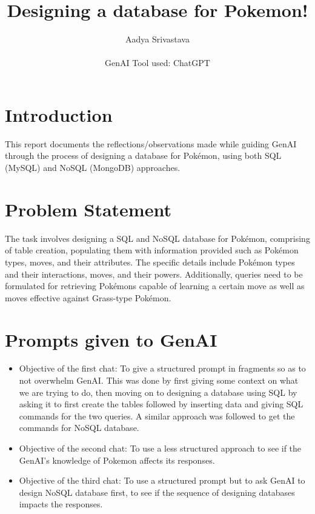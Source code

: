 \documentclass[10pt,onecolumn,letterpaper]{article}
\title{
    \usefont{OT1}{bch}{b}{n}
    \huge Designing a database for Pokemon!
}
\author{\large Aadya Srivastava \\ \\ GenAI Tool used: ChatGPT}
\begin{document}
\maketitle
{}

\section{Introduction}
This report documents the reflections/observations made while guiding GenAI through the process of designing a database for Pokémon, using both SQL (MySQL) and NoSQL (MongoDB) approaches.

\section{Problem Statement} 
The task involves designing a SQL and NoSQL database for Pokémon, comprising of table creation, populating them with information provided such as Pokémon types, moves, and their attributes. The specific details include Pokémon types and their interactions, moves, and their powers. Additionally, queries need to be formulated for retrieving Pokémons capable of learning a certain move as well as moves effective against Grass-type Pokémon.

\section{Prompts given to GenAI}
\begin{itemize}
    \item Objective of the first chat: To give a structured prompt in fragments so as to not overwhelm GenAI. This was done by first giving some context on what we are trying to do, then moving on to designing a database using SQL by asking it to first create the tables followed by inserting data and giving SQL commands for the two queries. A similar approach was followed to get the commands for NoSQL database.  
    \item Objective of the second chat: To use a less structured approach to see if the GenAI's knowledge of Pokemon affects its responses.
    \item Objective of the third chat: To use a structured prompt but to ask GenAI to design NoSQL database first, to see if the sequence of designing databases impacts the responses. 
\end{itemize}
\end{document}
